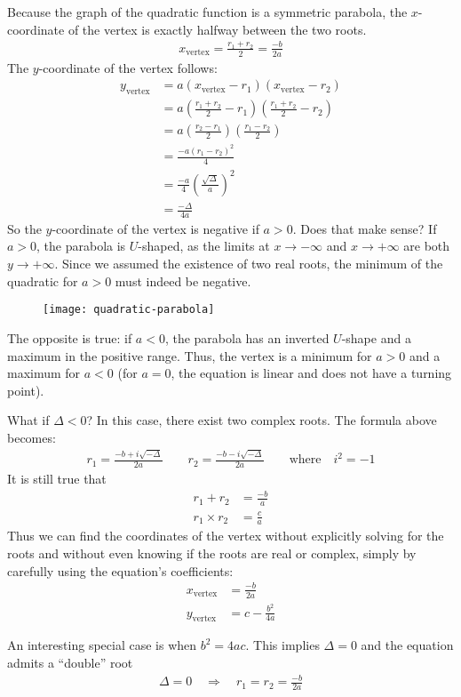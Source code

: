 Because the graph of the quadratic function is a symmetric parabola, the $x$-coordinate of the vertex is exactly halfway between the two roots.
\begin{align*}
x_{\text{vertex}} 
  = \frac{r_1+r_2}{2}
  = \frac{-b}{2a}
\end{align*}
The $y$-coordinate of the vertex follows: 
\begin{align*}
y_{\text{vertex}} 
  & = a (x_{\text{vertex}}-r_1)(x_{\text{vertex}}-r_2) \\
  & = a \left(\frac{r_1+r_2}{2}-r_1\right)\left(\frac{r_1+r_2}{2}-r_2\right) \\
  & = a \left(\frac{r_2-r_1}{2}\right)\left(\frac{r_1-r_2}{2}\right) \\
  & = \frac{-a\left(r_1-r_2\right)^2}{4} \\
  & = \frac{-a}{4}\left(\frac{\sqrt{\Delta}}{a}\right)^2 \\
  & = \frac{-\Delta}{4a}
\end{align*}
So the $y$-coordinate of the vertex is negative if $a>0$. Does that make sense? If $a>0$, the parabola is $U$-shaped, as the limits at $x\rightarrow-\infty$ and $x\rightarrow+\infty$ are both $y\rightarrow+\infty$. Since we assumed the existence of two real roots, the minimum of the quadratic for $a>0$ must indeed be negative. 
\begin{figure}[H]
\centering
\texttt{[image: quadratic-parabola]}
\end{figure}
The opposite is true: if $a<0$, the parabola has an inverted $U$-shape and a maximum in the positive range. Thus, the vertex is a minimum for $a>0$ and a maximum for $a<0$ (for $a=0$, the equation is linear and does not have a turning point). 

What if $\Delta<0$? In this case, there exist two complex roots. The formula above becomes:
\begin{align*}
r_1 = \frac{-b+i\sqrt{-\Delta}}{2a}
  \qquad
r_2 = \frac{-b-i\sqrt{-\Delta}}{2a} 
  \qquad\text{where}\quad i^2 = -1
\end{align*}
It is still true that
\begin{align*}
r_1 + r_2 
  & = \frac{-b}{a} \\
r_1 \times r_2 
  & = \frac{c}{a}
\end{align*}
Thus we can find the coordinates of the vertex without explicitly solving for the roots and without even knowing if the roots are real or complex, simply by carefully using the equation's coefficients:
\begin{align*}
x_{\text{vertex}} & = \frac{-b}{2a} \\
y_{\text{vertex}} & = c - \frac{b^2}{4a}
\end{align*}

An interesting special case is when $b^2=4ac$. This implies $\Delta=0$ and the equation admits a ``double'' root 
\begin{align*}
\Delta = 0 \quad\Rightarrow\quad r_1 = r_2 = \frac{-b}{2a}
\end{align*}
